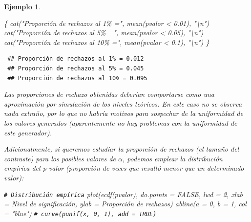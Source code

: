 \documentclass[
  10pt,
]{book}
\newenvironment{Shaded}{\begin{snugshade}}{\end{snugshade}}
\newcommand{\AttributeTok}[1]{\textcolor[rgb]{0.77,0.63,0.00}{#1}}
\newcommand{\CommentTok}[1]{\textcolor[rgb]{0.56,0.35,0.01}{\textit{#1}}}
\newcommand{\ConstantTok}[1]{\textcolor[rgb]{0.00,0.00,0.00}{#1}}
\newcommand{\DecValTok}[1]{\textcolor[rgb]{0.00,0.00,0.81}{#1}}
\newcommand{\FloatTok}[1]{\textcolor[rgb]{0.00,0.00,0.81}{#1}}
\newcommand{\FunctionTok}[1]{\textcolor[rgb]{0.00,0.00,0.00}{#1}}
\newcommand{\NormalTok}[1]{#1}
\newcommand{\SpecialCharTok}[1]{\textcolor[rgb]{0.00,0.00,0.00}{#1}}
\newcommand{\StringTok}[1]{\textcolor[rgb]{0.31,0.60,0.02}{#1}}
\theoremstyle{break}
\newtheorem{example}{Ejemplo}[chapter]
\theoremstyle{nonumberplain}
\renewcommand{\CommentTok}[1]{\textcolor[rgb]{0.41,0.41,0.41}{\texttt{#1}}}
\begin{document}
\begin{example}
\begin{Shaded}
\begin{Highlighting}[]
\NormalTok{\{}
\FunctionTok{cat}\NormalTok{(}\StringTok{"Proporción de rechazos al 1\% ="}\NormalTok{, }\FunctionTok{mean}\NormalTok{(pvalor }\SpecialCharTok{\textless{}} \FloatTok{0.01}\NormalTok{), }\StringTok{"}\SpecialCharTok{\textbackslash{}n}\StringTok{"}\NormalTok{)}
\FunctionTok{cat}\NormalTok{(}\StringTok{"Proporción de rechazos al 5\% ="}\NormalTok{, }\FunctionTok{mean}\NormalTok{(pvalor }\SpecialCharTok{\textless{}} \FloatTok{0.05}\NormalTok{), }\StringTok{"}\SpecialCharTok{\textbackslash{}n}\StringTok{"}\NormalTok{)}
\FunctionTok{cat}\NormalTok{(}\StringTok{"Proporción de rechazos al 10\% ="}\NormalTok{, }\FunctionTok{mean}\NormalTok{(pvalor }\SpecialCharTok{\textless{}} \FloatTok{0.1}\NormalTok{), }\StringTok{"}\SpecialCharTok{\textbackslash{}n}\StringTok{"}\NormalTok{)}
\NormalTok{\}}
\end{Highlighting}
\end{Shaded}

\begin{verbatim}
 ## Proporción de rechazos al 1% = 0.012 
 ## Proporción de rechazos al 5% = 0.045 
 ## Proporción de rechazos al 10% = 0.095
\end{verbatim}

Las proporciones de rechazo obtenidas deberían comportarse como una aproximación por simulación de los niveles teóricos.
En este caso no se observa nada extraño, por lo que no habría motivos para sospechar de la uniformidad de los valores generados (aparentemente no hay problemas con la uniformidad de este generador).

Adicionalmente, si queremos estudiar la proporción de rechazos (el \emph{tamaño del contraste}) para los posibles valores de \(\alpha\), podemos emplear la distribución empírica del p-valor (proporción de veces que resultó menor que un determinado valor):

\begin{Shaded}
\begin{Highlighting}[]
\CommentTok{\# Distribución empírica}
\FunctionTok{plot}\NormalTok{(}\FunctionTok{ecdf}\NormalTok{(pvalor), }\AttributeTok{do.points =} \ConstantTok{FALSE}\NormalTok{, }\AttributeTok{lwd =} \DecValTok{2}\NormalTok{, }
     \AttributeTok{xlab =} \StringTok{\textquotesingle{}Nivel de significación\textquotesingle{}}\NormalTok{, }\AttributeTok{ylab =} \StringTok{\textquotesingle{}Proporción de rechazos\textquotesingle{}}\NormalTok{)}
\FunctionTok{abline}\NormalTok{(}\AttributeTok{a =} \DecValTok{0}\NormalTok{, }\AttributeTok{b =} \DecValTok{1}\NormalTok{, }\AttributeTok{col =} \StringTok{"blue"}\NormalTok{)   }\CommentTok{\# curve(punif(x, 0, 1), add = TRUE)}
\end{Highlighting}
\end{Shaded}


\end{example}
\end{document}

